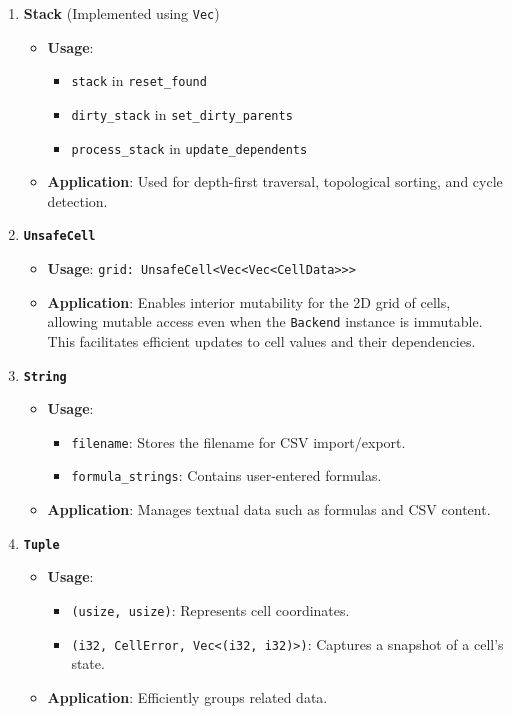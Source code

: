 \documentclass{article}
\begin{document}
\begin{enumerate}
   
    \item \textbf{Stack} (Implemented using \texttt{Vec})
    \begin{itemize}
        \item \textbf{Usage}:
        \begin{itemize}
            \item \texttt{stack} in \texttt{reset\_found}
            \item \texttt{dirty\_stack} in \texttt{set\_dirty\_parents}
            \item \texttt{process\_stack} in \texttt{update\_dependents}
        \end{itemize}
        \item \textbf{Application}: Used for depth-first traversal, topological sorting, and cycle detection.
    \end{itemize}
 \item \textbf{\texttt{UnsafeCell}}
    \begin{itemize}
        \item \textbf{Usage}: \texttt{grid: UnsafeCell<Vec<Vec<CellData>>>}
        \item \textbf{Application}: Enables interior mutability for the 2D grid of cells, allowing mutable access even when the \texttt{Backend} instance is immutable. This facilitates efficient updates to cell values and their dependencies.
    \end{itemize}
    \item \textbf{\texttt{String}}
    \begin{itemize}
        \item \textbf{Usage}:
        \begin{itemize}
            \item \texttt{filename}: Stores the filename for CSV import/export.
            \item \texttt{formula\_strings}: Contains user-entered formulas.
        \end{itemize}
        \item \textbf{Application}: Manages textual data such as formulas and CSV content.
    \end{itemize}

    \item \textbf{\texttt{Tuple}}
    \begin{itemize}
        \item \textbf{Usage}:
        \begin{itemize}
            \item \texttt{(usize, usize)}: Represents cell coordinates.
            \item \texttt{(i32, CellError, Vec<(i32, i32)>)}: Captures a snapshot of a cell's state.
        \end{itemize}
        \item \textbf{Application}: Efficiently groups related data.
    \end{itemize}


\end{enumerate}
\end{document}
